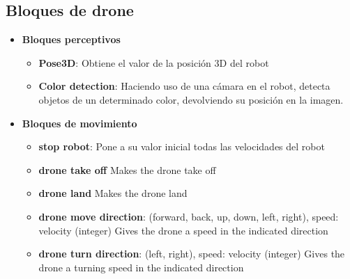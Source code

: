 \subsection{Bloques de drone}
\begin{itemize}
\item \textbf{Bloques perceptivos}
	\begin{itemize}
	\item \textbf{Pose3D}: Obtiene el valor de la posición 3D del robot
	\item \textbf{Color detection}: Haciendo uso de una cámara en el robot, detecta objetos de un determinado color, devolviendo su posición en la imagen.
	\end{itemize}
\item \textbf{Bloques de movimiento}
	\begin{itemize}
	\item \textbf{stop robot}: Pone a su valor inicial todas las velocidades del robot
	\item \textbf{drone take off} Makes the drone take off
	\item \textbf{drone land} Makes the drone land
	\item \textbf{drone move direction}: (forward, back, up, down, left, right), speed: velocity (integer)	Gives the drone a speed in the indicated direction
	\item \textbf{drone turn direction}: (left, right), speed: velocity (integer)		Gives the drone a turning speed in the indicated direction
	\end{itemize}
\end{itemize}



